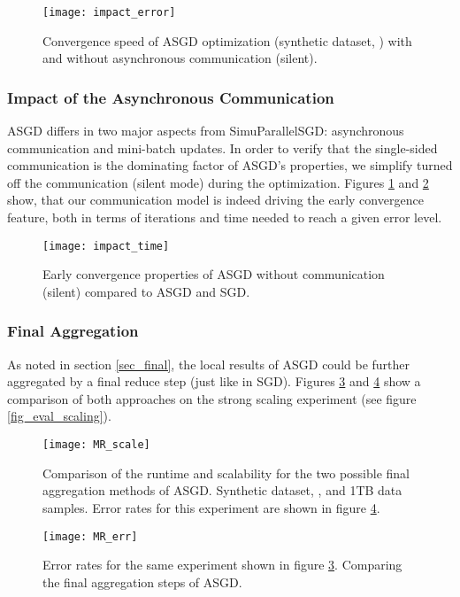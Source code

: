 \documentclass{acm_proc_article-sp}
\begin{document}
\begin{figure}[!ht]
\texttt{[image: impact\_error]}
\caption{Convergence speed of ASGD optimization (synthetic dataset, ) 
with and without asynchronous communication (silent). \label{fig_eval_impact_error}}
\end{figure}

\subsubsection*{Impact of the Asynchronous Communication\label{sec_ex_comim}}
ASGD differs in two major aspects from SimuParallelSGD: asynchronous communication and
mini-batch updates. In order to verify that the single-sided communication
is the dominating factor of ASGD's properties, we simplify turned off the 
communication (silent mode) during the optimization. Figures \ref{fig_eval_impact_error}
and \ref{fig_eval_impact_time} show, that our communication model is indeed 
driving the early convergence feature, both in terms of iterations and time needed
to reach a given error level.
\begin{figure}[!ht]
\texttt{[image: impact\_time]}
\caption{Early convergence properties of ASGD without communication (silent) compared
to ASGD and SGD. \label{fig_eval_impact_time}}
\end{figure}

\subsubsection*{Final Aggregation\label{sec_ex_agg}}
As noted in section \ref{sec_final}, the local results of ASGD could be further 
aggregated by a final reduce step (just like in SGD). Figures \ref{fig_eval_MR_scale}
and \ref{fig_eval_MR_err} show a comparison of both approaches on the
strong scaling experiment (see figure \ref{fig_eval_scaling}).  
\begin{figure}[!ht]
\texttt{[image: MR\_scale]}
\caption{Comparison of the runtime and scalability for the 
two possible final aggregation methods of ASGD. 
Synthetic dataset, , and 1TB data samples. 
Error rates for this experiment
are shown in figure \ref{fig_eval_MR_err}.  
\label{fig_eval_MR_scale}}
\end{figure}

\begin{figure}[!ht]
\texttt{[image: MR\_err]}
\caption{Error rates for the same experiment shown in figure \ref{fig_eval_MR_scale}.
Comparing the final aggregation steps of ASGD. 
\label{fig_eval_MR_err}}
\end{figure}
\end{document}
